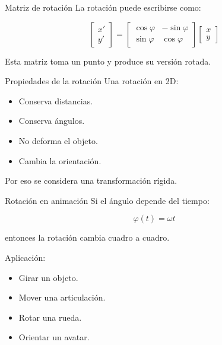 \documentclass{beamer}
\begin{document}
\begin{frame}{Matriz de rotación}
La rotación puede escribirse como:

\[
\begin{bmatrix}
x'\\
y'
\end{bmatrix}
=
\begin{bmatrix}
\cos\varphi & -\sin\varphi\\
\sin\varphi & \cos\varphi
\end{bmatrix}
\begin{bmatrix}
x\\
y
\end{bmatrix}
\]

\medskip

Esta matriz toma un punto y produce su versión rotada.
\end{frame}

\begin{frame}{Propiedades de la rotación}
Una rotación en 2D:

\begin{itemize}
    \item Conserva distancias.
    \item Conserva ángulos.
    \item No deforma el objeto.
    \item Cambia la orientación.
\end{itemize}

\medskip

Por eso se considera una transformación rígida.
\end{frame}

\begin{frame}{Rotación en animación}
Si el ángulo depende del tiempo:

\[
\varphi(t)=\omega t
\]

entonces la rotación cambia cuadro a cuadro.

\medskip

Aplicación:

\begin{itemize}
    \item Girar un objeto.
    \item Mover una articulación.
    \item Rotar una rueda.
    \item Orientar un avatar.
\end{itemize}
\end{frame}
\end{document}
